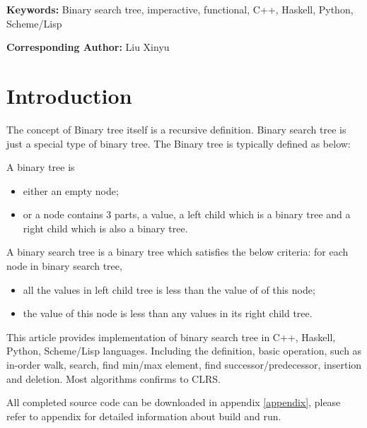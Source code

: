 \documentclass{article}
\begin{document}
\vspace{3cm}
{\bfseries Keywords:} Binary search tree, imperactive, functional, C++, Haskell, Python, Scheme/Lisp

{\bfseries Corresponding Author:} Liu Xinyu

\maketitle

\section{Introduction}
\label{introduction}

The concept of Binary tree itself is a recursive definition. Binary search tree is just a special type of
binary tree. The Binary tree is typically defined as below:

A binary tree is 
\begin{itemize}
\item either an empty node;
\item or a node contains 3 parts, a value, a left child which is a binary tree and a right child which is also a binary tree.
\end{itemize}

A binary search tree is a binary tree which satisfies the below criteria:
for each node in binary search tree,
\begin{itemize}
\item all the values in left child tree is less than the value of of this node;
\item the value of this node is less than any values in its right child tree.
\end{itemize}

This article provides implementation of binary search tree in C++, Haskell, Python, 
Scheme/Lisp languages. Including the definition, basic operation, such as
in-order walk, search, find min/max element, find successor/predecessor, insertion
and deletion. Most algorithms confirms to CLRS\cite{CLRS}.

All completed source code can be downloaded in appendix \ref{appendix}, please refer to appendix
for detailed information about build and run.

\end{document}
